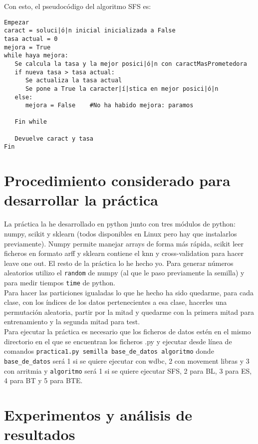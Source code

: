 \documentclass[12pt]{article}
\begin{document}
Con esto, el pseudocódigo del algoritmo SFS es:
\begin{lstlisting}
Empezar
caract = soluci|ó|n inicial inicializada a False
tasa actual = 0
mejora = True
while haya mejora:
   Se calcula la tasa y la mejor posici|ó|n con caractMasPrometedora
   if nueva tasa > tasa actual:
      Se actualiza la tasa actual
      Se pone a True la caracter|í|stica en mejor posici|ó|n
   else:
      mejora = False	#No ha habido mejora: paramos
      
   Fin while
   
   Devuelve caract y tasa
Fin

\end{lstlisting}

\newpage

\section{Procedimiento considerado para desarrollar la práctica}
La práctica la he desarrollado en python junto con tres módulos de python: numpy, scikit y sklearn (todos disponibles en Linux pero hay que instalarlos previamente). Numpy permite manejar arrays de forma más rápida, scikit leer ficheros en formato arff y sklearn contiene el knn y cross-validation para hacer leave one out. El resto de la práctica lo he hecho yo. Para generar números aleatorios utilizo el \texttt{random} de numpy (al que le paso previamente la semilla) y para medir tiempos \texttt{time} de python.\\

Para hacer las particiones igualadas lo que he hecho ha sido quedarme, para cada clase, con los índices de los datos pertenecientes a esa clase, hacerles una permutación aleatoria, partir por la mitad y quedarme con la primera mitad para entrenamiento y la segunda mitad para test.\\

Para ejecutar la práctica es necesario que los ficheros de datos estén en el mismo directorio en el que se encuentran los ficheros .py y ejecutar desde línea de comandos \texttt{practica1.py semilla base\_de\_datos algoritmo} donde \texttt{base\_de\_datos} será 1 si se quiere ejecutar con wdbc, 2 con movement libras y 3 con arritmia y \texttt{algoritmo} será 1 si se quiere ejecutar SFS, 2 para BL, 3 para ES, 4 para BT y 5 para BTE.

\newpage

\section{Experimentos y análisis de resultados}
\end{document}
